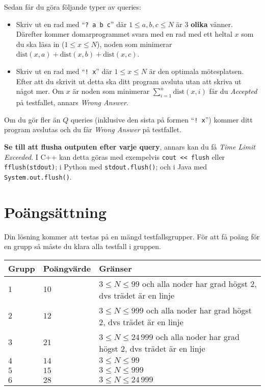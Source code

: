 Sedan får du göra följande typer av queries:
\begin{itemize}
    \item Skriv ut en rad med ``\verb|? a b c|'' där $1\le a,b,c\le N$ är $3$ \textbf{olika} vänner.
    Därefter kommer domarprogrammet svara med en rad med ett heltal $x$ som du ska läsa in
    ($1\le x\le N$), noden som minimerar $\text{dist}(x,a) +\text{dist}(x,b) +\text{dist}(x,c)$.
  \item Skriv ut en rad med ``\verb|! x|'' där $1\le x\le N$ är den optimala mötesplatsen.
    Efter att du skrivit ut detta ska ditt program avsluta utan att skriva ut något mer. 
    Om $x$ är noden som minimerar $\sum_{i=1}^{n} \text{dist}(x,i)$ får du \textit{Accepted} på testfallet, annars \textit{Wrong Answer}.
\end{itemize}
Om du gör fler än $Q$ queries (inklusive den sista på formen ``\verb|! x|'')
kommer ditt program avslutas och du får \textit{Wrong Answer} på testfallet.

\textbf{Se till att flusha outputen efter varje query}, annars kan du få \textit{Time Limit Exceeded}.
I C++ kan detta göras med exempelvis \texttt{cout << flush}
eller \texttt{fflush(stdout)};
i Python med \texttt{stdout.flush()};
och i Java med \texttt{System.out.flush()}.

\section*{Poängsättning}
Din lösning kommer att testas på en mängd testfallsgrupper.
För att få poäng för en grupp så måste du klara alla testfall i gruppen.


\noindent
\begin{tabular}{| l | l | l |}
  \hline
  Grupp & Poängvärde & Gränser \\ \hline \hline
  $1$   & $10$        & $3 \le N\le 99$ och alla noder har grad högst 2, dvs trädet är en linje \\ \hline
  $2$   & $12$        & $3 \le N\le 999$ och alla noder har grad högst 2, dvs trädet är en linje \\ \hline
  $3$   & $21$        & $3 \le N\le 24\,999$ och alla noder har grad högst 2, dvs trädet är en linje \\ \hline \hline
  $4$   & $14$        & $3 \le N\le 99$ \\ \hline
  $5$   & $15$        & $3 \le N\le 999$ \\ \hline
  $6$   & $28$        & $3 \le N\le 24\,999$ \\ \hline
\end{tabular}
